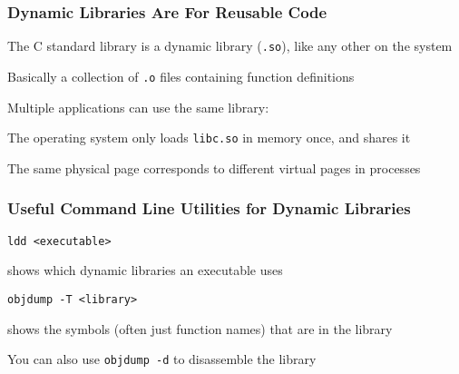   \begin{frame}
    \frametitle{Dynamic Libraries Are For Reusable Code}

    The C standard library is a dynamic library (\texttt{.so}), like any other
    on the system

    \hspace{1em} Basically a collection of \texttt{.o} files containing function
    definitions

    \vspace{1em}

    Multiple applications can use the same library:

    \vspace{1em}


    \vspace{1em}

    The operating system only loads \texttt{libc.so} in memory once, and shares
    it

    \hspace{1em} The same physical page corresponds to different virtual pages
    in processes
  \end{frame}

  \begin{frame}
    \frametitle{Useful Command Line Utilities for Dynamic Libraries}

    \texttt{ldd <executable>}

    \hspace{1em} shows which dynamic libraries an executable uses

    \vspace{4em}

    \texttt{objdump -T <library>}

    \hspace{1em} shows the symbols (often just function names) that are in the
    library

    \vspace{1em}

    You can also use \texttt{objdump -d} to disassemble the library
  \end{frame}

